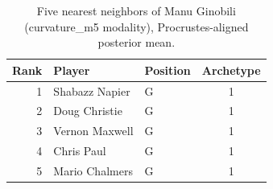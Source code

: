 \begin{table}[htbp]
  \centering\small
  \begin{tabular}{rllc}
    \toprule
    Rank & Player & Position & Archetype \\
    \midrule
    1 & Shabazz Napier & G & 1 \\
    2 & Doug Christie & G & 1 \\
    3 & Vernon Maxwell & G & 1 \\
    4 & Chris Paul & G & 1 \\
    5 & Mario Chalmers & G & 1 \\
    \bottomrule
  \end{tabular}
  \caption{Five nearest neighbors of Manu Ginobili (curvature_m5 modality), Procrustes-aligned posterior mean.}
  \label{tab:Manu_Ginobili_neighbors_curvature_m5}
\end{table}

